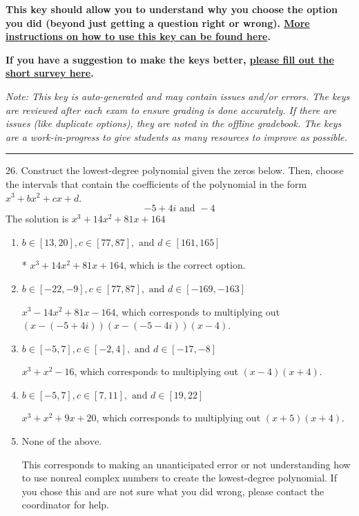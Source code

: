 \documentclass{article}[14pt]
\begin{document}
\textbf{This key should allow you to understand why you choose the option you did (beyond just getting a question right or wrong). \href{https://xronos.clas.ufl.edu/mac1105spring2020/courseDescriptionAndMisc/Exams/LearningFromResults}{More instructions on how to use this key can be found here}.}

\textbf{If you have a suggestion to make the keys better, \href{https://forms.gle/CZkbZmPbC9XALEE88}{please fill out the short survey here}.}

\textit{Note: This key is auto-generated and may contain issues and/or errors. The keys are reviewed after each exam to ensure grading is done accurately. If there are issues (like duplicate options), they are noted in the offline gradebook. The keys are a work-in-progress to give students as many resources to improve as possible.}

\rule{\textwidth}{0.4pt}

26. Construct the lowest-degree polynomial given the zeros below. Then, choose the intervals that contain the coefficients of the polynomial in the form $x^3+bx^2+cx+d$.
$$ -5 + 4i \text{ and } -4 $$ 
The solution is $ x^{3} +14 x^{2} +81 x + 164 $ 

\begin{enumerate}[label=\Alph*.] 
\item $ b \in [13, 20], c \in [77, 87], \text{ and } d \in [161, 165] $ 

 * $x^{3} +14 x^{2} +81 x + 164$, which is the correct option. 
\item $ b \in [-22, -9], c \in [77, 87], \text{ and } d \in [-169, -163] $ 

 $x^{3} -14 x^{2} +81 x -164$, which corresponds to multiplying out $(x-(-5 + 4i))(x-(-5 - 4i))(x -4)$. 
\item $ b \in [-5, 7], c \in [-2, 4], \text{ and } d \in [-17, -8] $ 

 $x^{3} + x^{2} -16$, which corresponds to multiplying out $(x -4)(x + 4)$. 
\item $ b \in [-5, 7], c \in [7, 11], \text{ and } d \in [19, 22] $ 

 $x^{3} + x^{2} +9 x + 20$, which corresponds to multiplying out $(x + 5)(x + 4)$. 
\item $ \text{None of the above.} $ 

 This corresponds to making an unanticipated error or not understanding how to use nonreal complex numbers to create the lowest-degree polynomial. If you chose this and are not sure what you did wrong, please contact the coordinator for help. 
\end{enumerate} 
 
\end{document}
